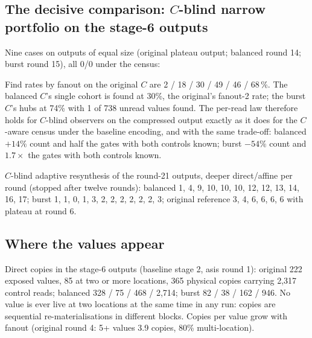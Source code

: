 \documentclass[11pt]{article}
\begin{document}
\subsection{The decisive comparison: $C$-blind narrow portfolio on the stage-6 outputs}
Nine cases on outputs of equal size (original plateau output; balanced round 14; burst round 15), all 0/0 under the census:

\begin{center}\footnotesize
{}
\end{center}

Find rates by fanout on the original $C$ are 2 / 18 / 30 / 49 / 46 / 68\,\%. The balanced $C$'s single cohort is found at 30\%, the original's fanout-2 rate; the burst $C$'s hubs at 74\% with 1 of 738 unread values found. The per-read law therefore holds for $C$-blind observers on the compressed output exactly as it does for the $C$-aware census under the baseline encoding, and with the same trade-off: balanced $+14\%$ count and half the gates with both controls known; burst $-54\%$ count and $1.7\times$ the gates with both controls known.

$C$-blind adaptive resynthesis of the round-21 outputs, deeper direct/affine per round (stopped after twelve rounds): balanced 1, 4, 9, 10, 10, 10, 12, 12, 13, 14, 16, 17; burst 1, 1, 0, 1, 3, 2, 2, 2, 2, 2, 2, 3; original reference 3, 4, 6, 6, 6, 6 with plateau at round 6.

\subsection{Where the values appear}
Direct copies in the stage-6 outputs (baseline stage 2, asis round 1): original 222 exposed values, 85 at two or more locations, 365 physical copies carrying 2,317 control reads; balanced 328 / 75 / 468 / 2,714; burst 82 / 38 / 162 / 946. No value is ever live at two locations at the same time in any run: copies are sequential re-materialisations in different blocks. Copies per value grow with fanout (original round 4: 5+ values 3.9 copies, 80\% multi-location).
\end{document}
